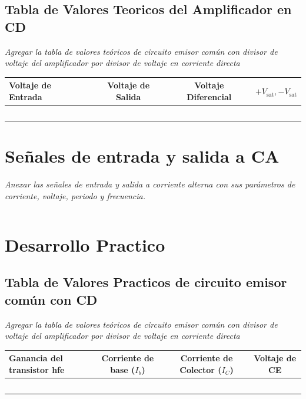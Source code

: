 \documentclass[11pt]{scrartcl}
\newcommand{\indicacion}[1]{\noindent\textit{\small #1}}
\begin{document}
\subsection{Tabla de Valores Teoricos del Amplificador en CD}
\indicacion{
Agregar la tabla de valores teóricos de circuito emisor común con divisor de voltaje del amplificador por divisor de voltaje en corriente directa
}

\begin{center}
\begin{tabular}{|p{3cm}|c|c|c|}
\hline
\textbf{Voltaje de Entrada}& \textbf{Voltaje de Salida} & \textbf{Voltaje Diferencial} & \textbf{$+V_{\text{sat}}, -V_{\text{sat}}$}\\
\hline
& & & \\[4px]
\hline
& & & \\[4px]
\hline
& & & \\[4px]
\hline
& & & \\[4px]
\hline
& & & \\[4px]
\hline
\end{tabular}
\end{center}


\section{Señales de entrada y salida a CA}
\indicacion{
    Anexar las señales de entrada y salida a corriente alterna con sus parámetros de corriente, voltaje, periodo y frecuencia.
}

\begin{center}
\begin{tabular}{|p{6cm}|p{6cm}|}
\hline
&  \\[100px]
\hline
\end{tabular}
\end{center}

\section{Desarrollo Practico}


\subsection{Tabla de Valores Practicos de circuito emisor común con CD}
\indicacion{
Agregar la tabla de valores teóricos de circuito emisor común con divisor de voltaje del amplificador por divisor de voltaje en corriente directa
}

\begin{center}
\begin{tabular}{|p{3cm}|c|c|c|}
\hline
\textbf{Ganancia del transistor hfe}& \textbf{Corriente de base ($I_b$)} & \textbf{Corriente de Colector ($I_C$)} & \textbf{Voltaje de CE}\\
\hline
& & & \\[4px]
\hline
& & & \\[4px]
\hline
& & & \\[4px]
\hline
& & & \\[4px]
\hline
& & & \\[4px]
\hline
\end{tabular}
\end{center}
\end{document}
